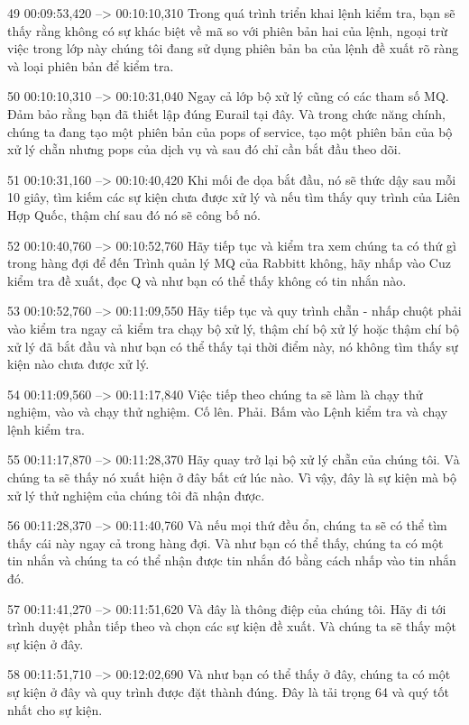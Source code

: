 49
00:09:53,420 --> 00:10:10,310
Trong quá trình triển khai lệnh kiểm tra, bạn sẽ thấy rằng không có sự khác biệt về mã so với phiên bản hai của lệnh, ngoại trừ việc trong lớp này chúng tôi đang sử dụng phiên bản ba của lệnh đề xuất rõ ràng và loại phiên bản để kiểm tra.

50
00:10:10,310 --> 00:10:31,040
Ngay cả lớp bộ xử lý cũng có các tham số MQ.  Đảm bảo rằng bạn đã thiết lập đúng Eurail tại đây.  Và trong chức năng chính, chúng ta đang tạo một phiên bản của pops of service, tạo một phiên bản của bộ xử lý chẵn nhưng pops của dịch vụ và sau đó chỉ cần bắt đầu theo dõi.

51
00:10:31,160 --> 00:10:40,420
Khi mối đe dọa bắt đầu, nó sẽ thức dậy sau mỗi 10 giây, tìm kiếm các sự kiện chưa được xử lý và nếu tìm thấy quy trình của Liên Hợp Quốc, thậm chí sau đó nó sẽ công bố nó.

52
00:10:40,760 --> 00:10:52,760
Hãy tiếp tục và kiểm tra xem chúng ta có thứ gì trong hàng đợi để đến Trình quản lý MQ của Rabbitt không, hãy nhấp vào Cuz kiểm tra đề xuất, đọc Q và như bạn có thể thấy không có tin nhắn nào.

53
00:10:52,760 --> 00:11:09,550
Hãy tiếp tục và quy trình chẵn - nhấp chuột phải vào kiểm tra ngay cả kiểm tra chạy bộ xử lý, thậm chí bộ xử lý hoặc thậm chí bộ xử lý đã bắt đầu và như bạn có thể thấy tại thời điểm này, nó không tìm thấy sự kiện nào chưa được xử lý.

54
00:11:09,560 --> 00:11:17,840
Việc tiếp theo chúng ta sẽ làm là chạy thử nghiệm, vào và chạy thử nghiệm.  Cố lên.  Phải.  Bấm vào Lệnh kiểm tra và chạy lệnh kiểm tra.

55
00:11:17,870 --> 00:11:28,370
Hãy quay trở lại bộ xử lý chẵn của chúng tôi.  Và chúng ta sẽ thấy nó xuất hiện ở đây bất cứ lúc nào.  Vì vậy, đây là sự kiện mà bộ xử lý thử nghiệm của chúng tôi đã nhận được.

56
00:11:28,370 --> 00:11:40,760
Và nếu mọi thứ đều ổn, chúng ta sẽ có thể tìm thấy cái này ngay cả trong hàng đợi.  Và như bạn có thể thấy, chúng ta có một tin nhắn và chúng ta có thể nhận được tin nhắn đó bằng cách nhấp vào tin nhắn đó.

57
00:11:41,270 --> 00:11:51,620
Và đây là thông điệp của chúng tôi.  Hãy đi tới trình duyệt phần tiếp theo và chọn các sự kiện đề xuất.  Và chúng ta sẽ thấy một sự kiện ở đây.

58
00:11:51,710 --> 00:12:02,690
Và như bạn có thể thấy ở đây, chúng ta có một sự kiện ở đây và quy trình được đặt thành đúng.  Đây là tải trọng 64 và quý tốt nhất cho sự kiện.

